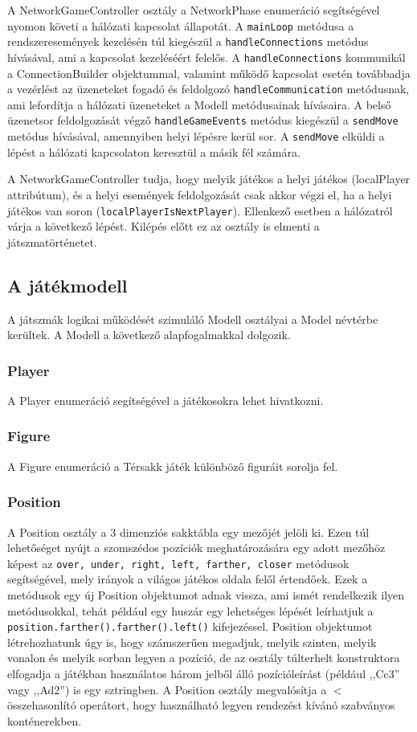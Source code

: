 \documentclass[12pt, twoside]{report}
\begin{document}
A NetworkGameController osztály a NetworkPhase enumeráció segítségével nyomon követi a hálózati kapcsolat állapotát. A {\tt mainLoop} metódusa a rendszeresemények kezelésén túl kiegészül a {\tt handleConnections} metódus hívásával, ami a kapcsolat kezeléséért felelős. A {\tt handleConnections} kommunikál a ConnectionBuilder objektummal, valamint működő kapcsolat esetén továbbadja a vezérlést az üzeneteket fogadó és feldolgozó {\tt handleCommunication} metódusnak, ami lefordítja a hálózati üzeneteket a Modell metódusainak hívásaira. A belső üzenetsor feldolgozását végző {\tt handleGameEvents} metódus kiegészül a {\tt sendMove} metódus hívásával, amennyiben helyi lépésre kerül sor. A {\tt sendMove} elküldi a lépést a hálózati kapcsolaton keresztül a másik fél számára. 

A NetworkGameController tudja, hogy melyik játékos a helyi játékos (localPlayer attribútum), és a helyi események feldolgozását csak akkor végzi el, ha a helyi játékos van soron ({\tt localPlayerIsNextPlayer}). Ellenkező esetben a hálózatról várja a következő lépést. Kilépés előtt ez az osztály is elmenti a játszmatörténetet.

\subsection {A játékmodell}

A játszmák logikai működését szimuláló Modell osztályai a Model névtérbe kerültek. A Modell a következő alapfogalmakkal dolgozik.

\subsubsection {Player}
A Player enumeráció segítségével a játékosokra lehet hivatkozni.

\subsubsection{Figure}
A Figure enumeráció a Térsakk játék különböző figuráit sorolja fel.

\subsubsection{Position}
A Position osztály a 3 dimenziós sakktábla egy mezőjét jelöli ki. Ezen túl lehetőséget nyújt a szomszédos pozíciók meghatározására egy adott mezőhöz képest az {\tt over, under, right, left, farther, closer} metódusok segítségével, mely irányok a világos játékos oldala felől értendőek. Ezek a metódusok egy új Position objektumot adnak vissza, ami ismét rendelkezik ilyen metódusokkal, tehát például egy huszár egy lehetséges lépését leírhatjuk a {\tt position.farther().farther().left()} kifejezéssel. Position objektumot létrehozhatunk úgy is, hogy számszerűen megadjuk, melyik szinten, melyik vonalon és melyik sorban legyen a pozíció, de az osztály túlterhelt konstruktora elfogadja a játékban használatos három jelből álló pozícióleírást (például ,,Cc3'' vagy ,,Ad2'') is egy sztringben. A Position osztály megvalósítja a $<$ összehasonlító operátort, hogy használható legyen rendezést kívánó szabványos konténerekben.
\end{document}
